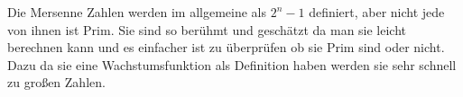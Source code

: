 Die Mersenne Zahlen werden im allgemeine als $2^{n}-1 $ definiert, aber nicht jede von ihnen ist Prim. Sie sind so berühmt und geschätzt da man sie leicht berechnen kann und es einfacher ist zu überprüfen ob sie Prim sind oder nicht. Dazu da sie eine Wachstumsfunktion als Definition haben werden sie sehr schnell zu großen Zahlen. 